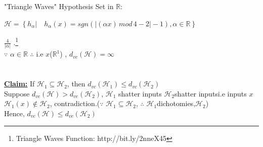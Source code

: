 \documentclass[a4paper,12pt]{article}
\begin{document}
\section{}
"Triangle Waves" Hypothesis Set in $\mathbb{R}$:\\
\begin{center}
$\mathcal{H}=\left \{   h_{\alpha}  \lvert \quad h_{\alpha}(x) = sgn(\left | (\alpha x) \, mod \, 4-2  \right |-1), \alpha \in \mathbb{R}     \right \}$
\end{center}
{\MbQ{}}$\frac{4}{\left | \alpha \right |}$ {\MbQ{}}.\footnote{Triangle Waves Function: http://bit.ly/2nneX45}\\
$\because$ $\alpha \in \mathbb{R}$ $\therefore$ {\MjQ{}}i.e $x${\MoQ{}}($\mathbb{R}^{1}$) {\MaQ{}}, {\MbQ{}}$d_{vc}(\mathcal{H})=\infty$
\section{}
\underline{\underline{\textbf{Claim:}}} If $\mathcal{H}_{1} \subseteq \mathcal{H}_{2}$, then $d_{vc}(\mathcal{H}_{1}) \leq d_{vc}(\mathcal{H}_{2})$\\
Suppose $d_{vc}(\mathcal{H}) > d_{vc}(\mathcal{H}_{2})$, {\MaQ{}} $\mathcal{H}_{1}$ {\MaQ{}}shatter {\MbQ{}}inputs {\MaQ{}} $\mathcal{H}_{2}${\MbQ{}}shatter {\MbQ{}}inputs{\MaQ{}}\zZ i.e {\McQ{}}inputs $x$ {\MaQ{}} $\mathcal{H}_{1}(x) \notin \mathcal{H}_{2}$, contradiction.($\because$ $\mathcal{H}_{1} \subseteq \mathcal{H}_{2}$, $\therefore$ $\mathcal{H}_{1}${\MbQ{}}dichotomies,$\mathcal{H}_{2}${\MaQ{}})\\
Hence, $d_{vc}(\mathcal{H}) \leq d_{vc}(\mathcal{H}_{2})$
\end{document}
